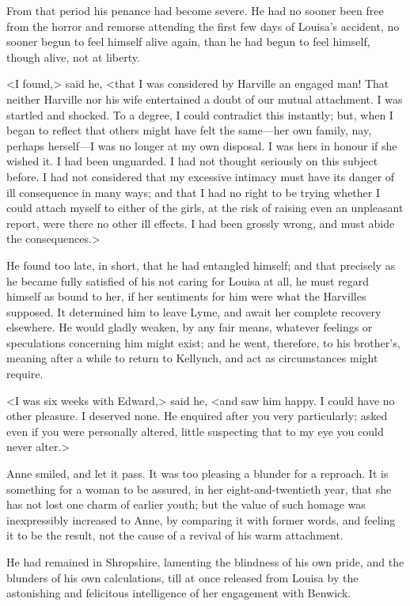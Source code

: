 From that period his penance had become severe. He had no sooner been free from the horror and remorse attending the first few days of Louisa's accident, no sooner begun to feel himself alive again, than he had begun to feel himself, though alive, not at liberty.

<I found,> said he, <that I was considered by Harville an engaged man! That neither Harville nor his wife entertained a doubt of our mutual attachment. I was startled and shocked. To a degree, I could contradict this instantly; but, when I began to reflect that others might have felt the same—her own family, nay, perhaps herself—I was no longer at my own disposal. I was hers in honour if she wished it. I had been unguarded. I had not thought seriously on this subject before. I had not considered that my excessive intimacy must have its danger of ill consequence in many ways; and that I had no right to be trying whether I could attach myself to either of the girls, at the risk of raising even an unpleasant report, were there no other ill effects. I had been grossly wrong, and must abide the consequences.>

He found too late, in short, that he had entangled himself; and that precisely as he became fully satisfied of his not caring for Louisa at all, he must regard himself as bound to her, if her sentiments for him were what the Harvilles supposed. It determined him to leave Lyme, and await her complete recovery elsewhere. He would gladly weaken, by any fair means, whatever feelings or speculations concerning him might exist; and he went, therefore, to his brother's, meaning after a while to return to Kellynch, and act as circumstances might require.

<I was six weeks with Edward,> said he, <and saw him happy. I could have no other pleasure. I deserved none. He enquired after you very particularly; asked even if you were personally altered, little suspecting that to my eye you could never alter.>

Anne smiled, and let it pass. It was too pleasing a blunder for a reproach. It is something for a woman to be assured, in her eight-and-twentieth year, that she has not lost one charm of earlier youth; but the value of such homage was inexpressibly increased to Anne, by comparing it with former words, and feeling it to be the result, not the cause of a revival of his warm attachment.

He had remained in Shropshire, lamenting the blindness of his own pride, and the blunders of his own calculations, till at once released from Louisa by the astonishing and felicitous intelligence of her engagement with Benwick.

